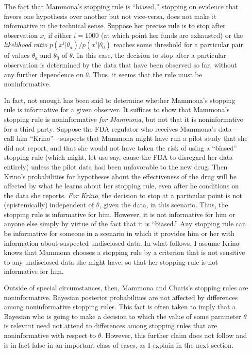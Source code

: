 \documentclass{article}
\theoremstyle{definition}
\begin{document}
The fact that Mammona's stopping rule is ``biased,'' stopping on evidence that favors one hypothesis over another but not vice-versa, does not make it informative in the technical sense.
Suppose her precise rule is to stop after observation $x_i$ if either $i=1000$ (at which point her funds are exhausted) or the \textit{likelihood ratio} $p(x^i|\theta_a)/p(x^i|\theta_0)$ reaches some threshold for a particular pair of values $\theta_a$ and $\theta_0$ of $\theta$.
In this case, the decision to stop after a particular observation is determined by the data that have been observed so far, without any further dependence on $\theta$.
Thus, it seems that the rule must be noninformative.

In fact, not enough has been said to determine whether Mammona's stopping rule is informative for a given observer.
It suffices to show that Mammona's stopping rule is noninformative \textit{for Mammona}, but not that it is noninformative for a third party.
Suppose the FDA regulator who receives Mammona's data---call him ``Krino''---suspects that Mammona might have run a pilot study that she did not report, and that she would not have taken the risk of using a ``biased'' stopping rule (which might, let use say, cause the FDA to disregard her data entirely) unless the pilot data had been unfavorable to the new drug.
Then Krino's probabilities for hypotheses about the effectiveness of the drug will be affected by what he learns about her stopping rule, even after he conditions on the data she reports.
\textit{For Krino}, the decision to stop at a particular point is not (epistemically) independent of $\theta$, given the data, in this scenario.
Thus, the stopping rule is informative for him.
However, it is not informative for him or anyone else simply by virtue of the fact that it is ``biased.''
Any stopping rule can be informative for someone in a scenario in which it provides him or her with information about suspected undisclosed data.
In what follows, I assume Krino knows that Mammona chooses a stopping rule by a criterion that is not sensitive to any undisclosed data she might have, so that her stopping rule is not informative for him.

Outside of special circumstances, then, Mammona and Charis's stopping rules are noninformative.
Bayesian posterior probabilities are not affected by differences among noninformative stopping rules.
This fact is often taken to imply that a Bayesian who is going to make a decision to which the value of some parameter $\theta$ is relevant need not attend to differences among stopping rules that are noninformative with respect to $\theta$.
However, this further claim does not follow and is in fact false in an important class of cases, as I explain in the next section.
\end{document}
